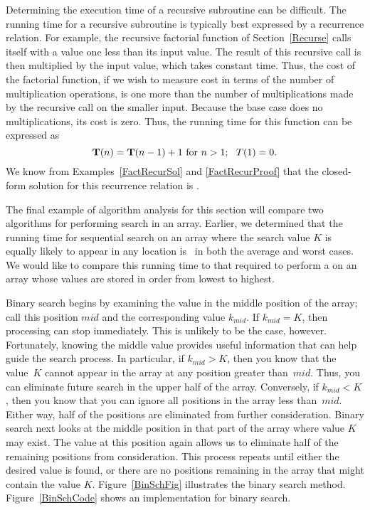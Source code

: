 Determining the execution time of a recursive
subroutine can be difficult.
The running time for a recursive subroutine is
typically best expressed by a recurrence relation.
For example, the recursive factorial
function  of Section~\ref{Recurse} calls itself with a
value one less than its input value.
The result of this recursive call is then multiplied by the input
value, which takes constant time.
Thus, the cost of the factorial function, if we wish to measure cost
in terms of the number of multiplication operations,
is one more than the number of multiplications made by the recursive
call on the smaller input.
Because the base case does no multiplications, its cost is zero.
Thus, the running time for this function can be expressed as
\[ \mbox{$\textbf{T}(n)$} = \mbox{$\textbf{T}(n-1)$} + 1 \ \mbox{for}\ n>1;\ \ T(1) = 0.\]
\noindent We know from Examples~\ref{FactRecurSol} and
\ref{FactRecurProof} that 
the closed-form solution for this recurrence relation
is \Thetan.

The final example of algorithm analysis for this section will compare
two algorithms for performing search in an array.
Earlier, we determined that the running time for sequential search on
an array where the search value \(K\) is equally likely to appear in any
location is \Thetan\ in both the average and worst cases.
We would like to compare this running time to that required to perform
a  on an array whose values are stored in order
from lowest to highest.

Binary search begins by examining the value in the middle
position of the array; call this position \(mid\) and the
corresponding value \(k_{mid}\).
If \mbox{\(k_{mid} = K\)}, then processing can stop immediately.
This is unlikely to be the case, however.
Fortunately, knowing the middle value provides useful information
that can help guide the search process.
In particular, if \mbox{\(k_{mid} > K\)},
then you know that the value~\(K\)
cannot appear in the array at any position greater than~\(mid\).
Thus, you can eliminate future search in the upper half of the array.
Conversely, if \mbox{\(k_{mid} < K\)}, then you know that you can
ignore all positions in the array less than~\(mid\).
Either way, half of the positions are eliminated from further
consideration.
Binary search next looks at the middle position in that part of the
array where value \(K\) may exist.
The value at this position again allows us to eliminate half
of the remaining positions from consideration.
This process repeats until either the desired value is found, or
there are no positions remaining in the array that might contain the
value \(K\).
Figure~\ref{BinSchFig} illustrates the binary search method.
Figure~\ref{BinSchCode} shows an implementation for binary search.

